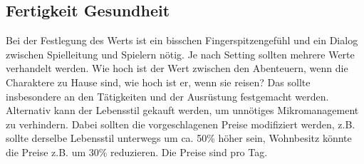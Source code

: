 \documentclass{article}
\begin{document}
\begin{center}
\subsection{Fertigkeit Gesundheit}
\end{center}

Bei der Festlegung des Werts ist ein bisschen Fingerspitzengefühl und ein Dialog zwischen Spielleitung und Spielern
nötig. Je nach Setting sollten mehrere Werte verhandelt werden. Wie hoch ist der Wert zwischen den Abenteuern, wenn
die Charaktere zu Hause sind, wie hoch ist er, wenn sie reisen? Das sollte insbesondere an den Tätigkeiten und der
Ausrüstung festgemacht werden. Alternativ kann der Lebensstil gekauft werden, um unnötiges Mikromanagement zu
verhindern. Dabei sollten die vorgeschlagenen Preise modifiziert werden, z.B. sollte derselbe Lebensstil unterwegs um
ca. 50\% höher sein, Wohnbesitz könnte die Preise z.B. um 30\% reduzieren. Die Preise sind pro Tag.
\end{document}
